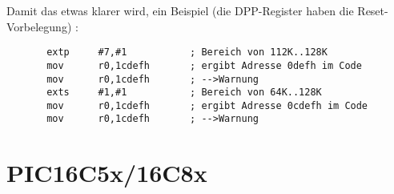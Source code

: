 \documentclass[12pt,a4paper,twoside]{report}
\begin{document}
Damit das etwas klarer wird, ein Beispiel (die DPP-Register haben
die Reset-Vorbelegung) :
\begin{verbatim}
       extp     #7,#1           ; Bereich von 112K..128K
       mov      r0,1cdefh       ; ergibt Adresse 0defh im Code
       mov      r0,1cdefh       ; -->Warnung
       exts     #1,#1           ; Bereich von 64K..128K
       mov      r0,1cdefh       ; ergibt Adresse 0cdefh im Code
       mov      r0,1cdefh       ; -->Warnung
\end{verbatim}


\section{PIC16C5x/16C8x}
\end{document}
